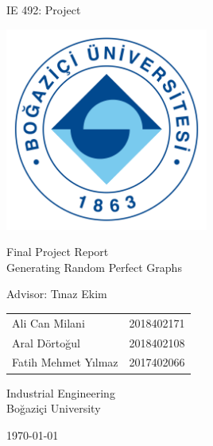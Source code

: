 \begin{titlepage}
    \begin{center}
            
        \LARGE
        IE 492: Project
            
        \vspace{1cm}
        \includegraphics[width=0.5\textwidth]{images/boun_logo.png}
        
        Final Project Report\\[0.3cm]
        \huge
        Generating Random Perfect Graphs
        
        \vspace{0.5cm}
        \LARGE
        Advisor: Tınaz Ekim

        \vfill
        
        \begin{table}[h]
        \centering
        \Large
        \begin{tabular}{p{6.5cm}r}
        Ali Can Milani & 2018402171 \\
        Aral Dörtoğul & 2018402108 \\
        Fatih Mehmet Yılmaz & 2017402066
        \end{tabular}
        \end{table}
            
        \vfill
            
        \large
        Industrial Engineering\\
        Boğaziçi University
        
        \vspace{0.8cm}

        \today
            
    \end{center}
\end{titlepage}